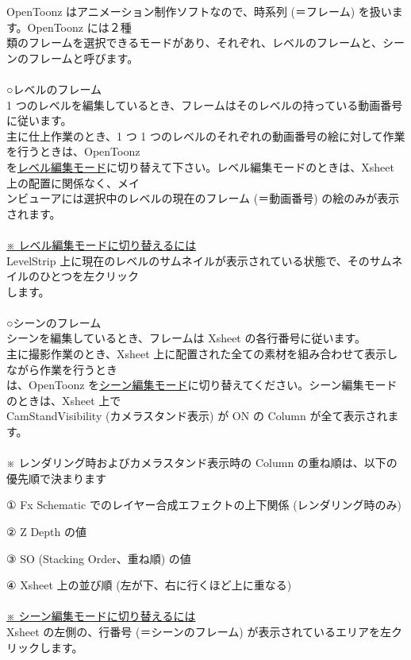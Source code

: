 \documentclass[a4paper,10pt]{article}
\begin{document}
\normalsize
\noindent OpenToonz はアニメーション制作ソフトなので、時系列 (＝フレーム) を扱います。OpenToonz には２種\\
類のフレームを選択できるモードがあり、それぞれ、レベルのフレームと、シーンのフレームと呼びます。\\
\\
\large
○レベルのフレーム\\
\normalsize
1 つのレベルを編集しているとき、フレームはそのレベルの持っている動画番号に従います。\\
主に仕上作業のとき、1 つ 1 つのレベルのそれぞれの動画番号の絵に対して作業を行うときは、OpenToonz\\
を\uline{レベル編集モード}に切り替えて下さい。レベル編集モードのときは、Xsheet 上の配置に関係なく、メイ\\
ンビューアには選択中のレベルの現在のフレーム (＝動画番号) の絵のみが表示されます。\\
\\
\uline{※ レベル編集モードに切り替えるには}\\
LevelStrip 上に現在のレベルのサムネイルが表示されている状態で、そのサムネイルのひとつを左クリック\\
します。\\[0.5em]
\\
\large
○シーンのフレーム\\
\normalsize
シーンを編集しているとき、フレームは Xsheet の各行番号に従います。\\
主に撮影作業のとき、Xsheet 上に配置された全ての素材を組み合わせて表示しながら作業を行うとき\\
は、OpenToonz を\uline{シーン編集モード}に切り替えてください。シーン編集モードのときは、Xsheet 上で\\
CamStandVisibility (カメラスタンド表示) が ON の Column が全て表示されます。\\
\\
※ レンダリング時およびカメラスタンド表示時の Column の重ね順は、以下の優先順で決まります\par
① Fx Schematic でのレイヤー合成エフェクトの上下関係 (レンダリング時のみ)\par
② Z Depth の値\par
③ SO (Stacking Order、重ね順) の値\par
④ Xsheet 上の並び順 (左が下、右に行くほど上に重なる)\\
\\
\uline{※ シーン編集モードに切り替えるには}\\
Xsheet の左側の、行番号 (＝シーンのフレーム) が表示されているエリアを左クリックします。
\end{document}
